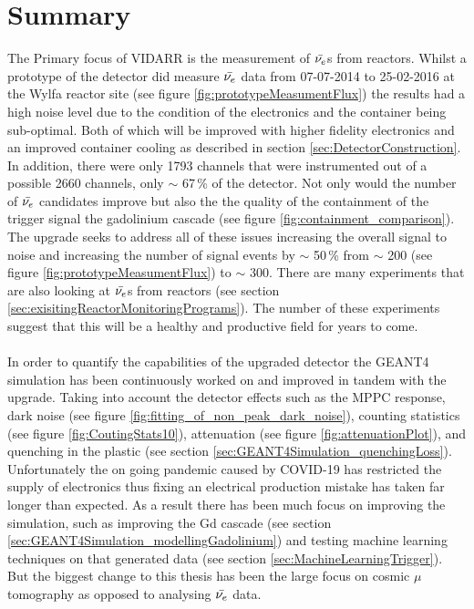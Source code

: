 
\chapter{Summary}

\ifpdf
    \graphicspath{{Chapter6/Figs/Raster/}{Chapter6/Figs/PDF/}{Chapter6/Figs/}}
\else
    \graphicspath{{Chapter6/Figs/Vector/}{Chapter6/Figs/}}
\fi

The Primary focus of VIDARR is the measurement of $\Bar{\nu_e}$s from reactors. Whilst a prototype of the detector did measure $\Bar{\nu_e}$ data from 07-07-2014 to 25-02-2016 at the Wylfa reactor site (see figure \ref{fig:prototypeMeasumentFlux}) the results had a high noise level due to the condition of the electronics and the container being sub-optimal. Both of which will be improved with higher fidelity electronics and an improved container cooling as described in section \ref{sec:DetectorConstruction}. In addition, there were only 1793 channels that were instrumented out of a possible 2660 channels, only $\sim$ 67\,\% of the detector. Not only would the number of $\Bar{\nu_e}$ candidates improve but also the the quality of the containment of the trigger signal the gadolinium cascade (see figure \ref{fig:containment_comparison}). The upgrade seeks to address all of these issues increasing the overall signal to noise and increasing the number of signal events by $\sim$ 50\,\% from $\sim$ 200 (see figure \ref{fig:prototypeMeasumentFlux}) to $\sim$ 300. There are many experiments that are also looking at $\Bar{\nu_e}$s from reactors (see section \ref{sec:exisitingReactorMonitoringPrograms}). The number of these experiments suggest that this will be a healthy and productive field for years to come.
\\\\In order to quantify the capabilities of the upgraded detector the GEANT4 simulation has been continuously worked on and improved in tandem with the upgrade. Taking into account the detector effects such as the MPPC response, dark noise (see figure \ref{fig:fitting_of_non_peak_dark_noise}), counting statistics (see figure \ref{fig:CoutingStats10}), attenuation (see figure \ref{fig:attenuationPlot}), and quenching in the plastic (see section \ref{sec:GEANT4Simulation_quenchingLoss}). Unfortunately the on going pandemic caused by COVID-19 has restricted the supply of electronics thus fixing an electrical production mistake has taken far longer than expected. As a result there has been much focus on improving the simulation, such as improving the Gd cascade (see section \ref{sec:GEANT4Simulation_modellingGadolinium}) and testing machine learning techniques on that generated data (see section \ref{sec:MachineLearningTrigger}). But the biggest change to this thesis has been the large focus on cosmic $\mu$ tomography as opposed to analysing $\Bar{\nu_e}$ data.
